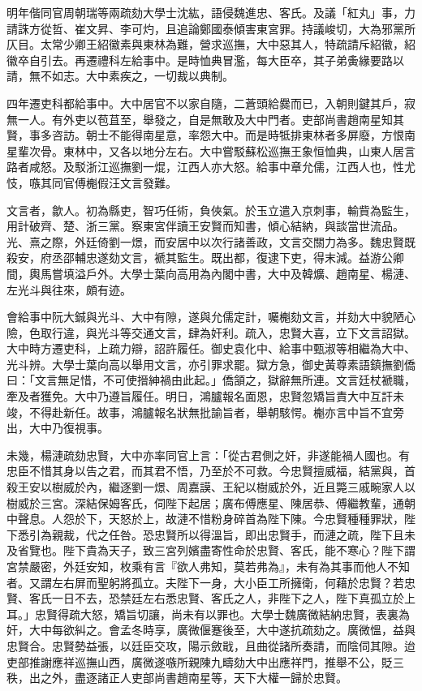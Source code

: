 \begin{pinyinscope}
明年偕同官周朝瑞等兩疏劾大學士沈紘，語侵魏進忠、客氏。及議「紅丸」事，力請誅方從哲、崔文昇、李可灼，且追論鄭國泰傾害東宮罪。持議峻切，大為邪黨所仄目。太常少卿王紹徽素與東林為難，營求巡撫，大中惡其人，特疏請斥紹徽，紹徽卒自引去。再遷禮科左給事中。是時恤典冒濫，每大臣卒，其子弟夤緣要路以請，無不如志。大中素疾之，一切裁以典制。

四年遷吏科都給事中。大中居官不以家自隨，二蒼頭給爨而已，入朝則鍵其戶，寂無一人。有外吏以苞苴至，舉發之，自是無敢及大中門者。吏部尚書趙南星知其賢，事多咨訪。朝士不能得南星意，率怨大中。而是時牴排東林者多屏廢，方恨南星輩次骨。東林中，又各以地分左右。大中嘗駁蘇松巡撫王象恒恤典，山東人居言路者咸怒。及駁浙江巡撫劉一焜，江西人亦大怒。給事中章允儒，江西人也，性尤忮，嗾其同官傅櫆假汪文言發難。

文言者，歙人。初為縣吏，智巧任術，負俠氣。於玉立遣入京刺事，輸貲為監生，用計破齊、楚、浙三黨。察東宮伴讀王安賢而知書，傾心結納，與談當世流品。光、熹之際，外廷倚劉一燝，而安居中以次行諸善政，文言交關力為多。魏忠賢既殺安，府丞邵輔忠遂劾文言，褫其監生。既出都，復逮下吏，得末減。益游公卿間，輿馬嘗填溢戶外。大學士葉向高用為內閣中書，大中及韓爌、趙南星、楊漣、左光斗與往來，頗有迹。

會給事中阮大鋮與光斗、大中有隙，遂與允儒定計，囑櫆劾文言，并劾大中貌陋心險，色取行違，與光斗等交通文言，肆為奸利。疏入，忠賢大喜，立下文言詔獄。大中時方遷吏科，上疏力辯，詔許履任。御史袁化中、給事中甄淑等相繼為大中、光斗辨。大學士葉向高以舉用文言，亦引罪求罷。獄方急，御史黃尊素語鎮撫劉僑曰：「文言無足惜，不可使搢紳禍由此起。」僑頷之，獄辭無所連。文言廷杖褫職，牽及者獲免。大中乃遵旨履任。明日，鴻臚報名面恩，忠賢忽矯旨責大中互訐未竣，不得赴新任。故事，鴻臚報名狀無批諭旨者，舉朝駭愕。櫆亦言中旨不宜旁出，大中乃復視事。

未幾，楊漣疏劾忠賢，大中亦率同官上言：「從古君側之奸，非遂能禍人國也。有忠臣不惜其身以告之君，而其君不悟，乃至於不可救。今忠賢擅威福，結黨與，首殺王安以樹威於內，繼逐劉一燝、周嘉謨、王紀以樹威於外，近且斃三戚畹家人以樹威於三宮。深結保姆客氏，伺陛下起居；廣布傅應星、陳居恭、傅繼教輩，通朝中聲息。人怨於下，天怒於上，故漣不惜粉身碎首為陛下陳。今忠賢種種罪狀，陛下悉引為親裁，代之任咎。恐忠賢所以得溫旨，即出忠賢手，而漣之疏，陛下且未及省覽也。陛下貴為天子，致三宮列嬪盡寄性命於忠賢、客氏，能不寒心？陛下謂宮禁嚴密，外廷安知，枚乘有言『欲人弗知，莫若弗為』，未有為其事而他人不知者。又謂左右屏而聖躬將孤立。夫陛下一身，大小臣工所擁衛，何藉於忠賢？若忠賢、客氏一日不去，恐禁廷左右悉忠賢、客氏之人，非陛下之人，陛下真孤立於上耳。」忠賢得疏大怒，矯旨切讓，尚未有以罪也。大學士魏廣微結納忠賢，表裏為奸，大中每欲糾之。會孟冬時享，廣微偃蹇後至，大中遂抗疏劾之。廣微慍，益與忠賢合。忠賢勢益張，以廷臣交攻，陽示斂戢，且曲從諸所奏請，而陰伺其隙。迨吏部推謝應祥巡撫山西，廣微遂嗾所親陳九疇劾大中出應祥門，推舉不公，貶三秩，出之外，盡逐諸正人吏部尚書趙南星等，天下大權一歸於忠賢。


\end{pinyinscope}
